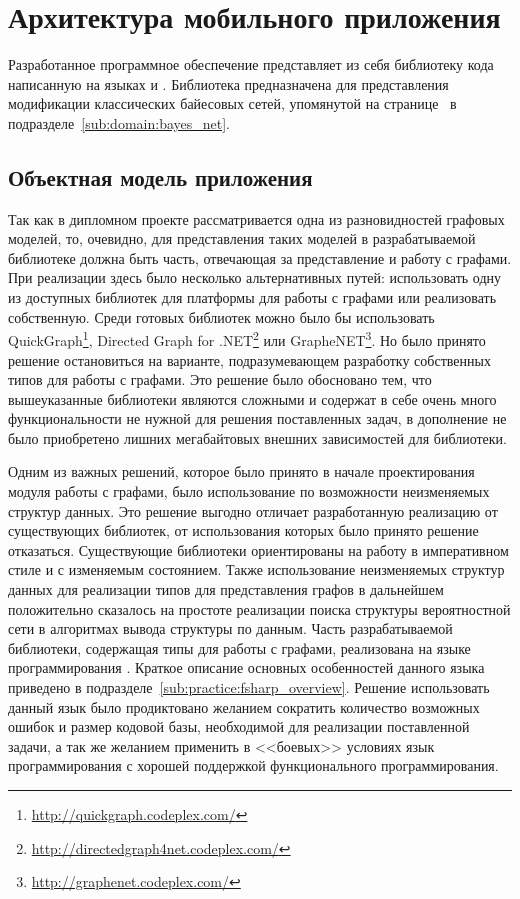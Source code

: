 
\section{Архитектура мобильного приложения} %
\label{sec:arch}

Разработанное программное обеспечение представляет из себя библиотеку кода написанную на языках \fsharp{} и \csharp{}.
Библиотека предназначена для представления модификации классических байесовых сетей, упомянутой на странице~\pageref{page:domain:bayes_mod} в подразделе~\ref{sub:domain:bayes_net}.

\subsection{Объектная модель приложения}
\label{sub:arch:object_model}

Так как в дипломном проекте рассматривается одна из разновидностей графовых моделей, то, очевидно, для представления таких моделей в разрабатываемой библиотеке должна быть часть, отвечающая за представление и работу с графами.
При реализации здесь было несколько альтернативных путей: использовать одну из доступных библиотек для платформы \dotnet{} для работы с графами или реализовать собственную.
Среди готовых библиотек можно было бы использовать QuickGraph\footnote{\url{http://quickgraph.codeplex.com/}}, Directed Graph for .NET\footnote{\url{http://directedgraph4net.codeplex.com/}} или GrapheNET\footnote{\url{http://graphenet.codeplex.com/}}.
Но было принято решение остановиться на варианте, подразумевающем разработку собственных типов для работы с графами.
Это решение было обосновано тем, что вышеуказанные библиотеки являются сложными и содержат в себе очень много функциональности не нужной для решения поставленных задач, в дополнение не было приобретено лишних мегабайтовых внешних зависимостей для библиотеки.

Одним из важных решений, которое было принято в начале проектирования модуля работы с графами, было использование по возможности неизменяемых структур данных.
Это решение выгодно отличает разработанную реализацию от существующих библиотек, от использования которых было принято решение отказаться. 
Существующие библиотеки ориентированы на работу в императивном стиле и с изменяемым состоянием.
Также использование неизменяемых структур данных для реализации типов для представления графов в дальнейшем положительно сказалось на простоте реализации поиска структуры вероятностной сети в алгоритмах вывода структуры по данным.
Часть разрабатываемой библиотеки, содержащая типы для работы с графами, реализована на языке программирования \fsharp{}.
Краткое описание основных особенностей данного языка приведено в подразделе~\ref{sub:practice:fsharp_overview}.
Решение использовать данный язык было продиктовано желанием сократить количество возможных ошибок и размер кодовой базы, необходимой для реализации поставленной задачи, а так же желанием применить в <<боевых>> условиях язык программирования с хорошей поддержкой функционального программирования.

